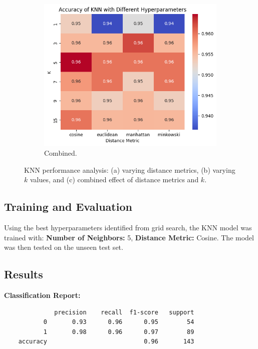\documentclass[12pt]{article}
\begin{document}
\begin{figure}[h!]
\begin{subfigure}[b]{0.3\textwidth}
        \includegraphics[width=\textwidth]{assets/knn/knn-all.png}
        \caption{Combined.}
        \label{fig:knn_varying_distance_and_k}
    \end{subfigure}

    \caption{KNN performance analysis: (a) varying distance metrics, (b) varying $k$ values, and (c) combined effect of distance metrics and $k$.}
    \label{fig:knn_subfigures}
\end{figure}







\subsection*{Training and Evaluation}

Using the best hyperparameters identified from grid search, the KNN model was trained with: \textbf{Number of Neighbors:} 5, \textbf{Distance Metric:} Cosine. The model was then tested on the unseen test set.


\subsection*{Results}

\textbf{Classification Report:}
\begin{verbatim}
              precision    recall  f1-score   support
           0       0.93      0.96      0.95        54
           1       0.98      0.96      0.97        89
    accuracy                           0.96       143
\end{verbatim}
\end{document}
